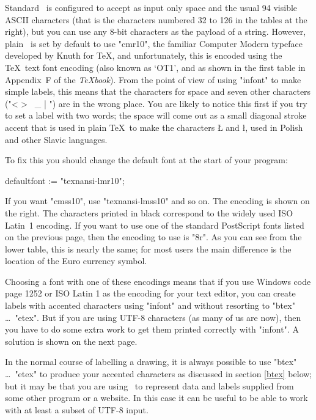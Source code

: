 \documentclass[a4paper,landscape]{article}
\def\mpic#1#2{\vadjust{\moveright5.5in\vbox to 0pt{\hsize4in\vskip#1\centerline{\texttt{[image: \#2]}}\vss}}}
\begin{document}
Standard \MP\ is configured to accept as input only space and the usual 94 visible
ASCII characters (that is the characters numbered 32 to 126 in the tables at the
right), but you can use any 8-bit characters as the payload of a string. 
However, plain \MP\ is set by default to use "cmr10", the familiar Computer Modern typeface
developed by Knuth for \TeX, and unfortunately, this is encoded using the \TeX\ text
font encoding (also known as `OT1', and as shown in the first table in Appendix~F of the {\sl \TeX book}).  
\mpic{-72pt}{font-sampler1.pdf}  
From the point of
view of using "infont" to make simple labels, this means that the characters for
space and seven other characters ("< > \ _ { | }") are in the wrong place.  
You are likely to notice this first if you try to set a label with two words; the
space will come out as a small diagonal stroke accent that is used in plain \TeX\
to make the characters Ł and ł, used in Polish and other Slavic languages.

To fix this you should change the default font at the start of your program:
\begin{code}
defaultfont := "texnansi-lmr10";  %
\end{code}
If you want "cmss10", use "texnansi-lmss10" and so on.  The encoding is shown on the
right.  The characters printed in black correspond to the widely used ISO Latin~1
encoding.  If you want to use one of the standard PostScript fonts listed on the
previous page, then the encoding to use is "8r".  As you can see from the lower
table, this is nearly the
same; for most users the main difference is the location of the Euro currency
symbol.
   
Choosing a font with one of these encodings means that if you use Windows code page
1252 or ISO Latin 1 as the encoding for your text editor, you can create labels with
accented characters using "infont" and without resorting to "btex" \dots\ "etex".
But if you are using UTF-8 characters (as many of us are now), then you have to do
some extra work to get them printed correctly with "infont".  A solution is shown on
the next page.  

In the normal course of labelling a drawing, it is always possible to
use "btex" \dots\ "etex" to produce your accented characters as discussed in section
\ref{btex} below; but it may be that you are using \MP\ to represent data and labels
supplied from some other program or a website.  In this case it can be useful to be
able to work with at least a subset of UTF-8 input.
\end{document}
